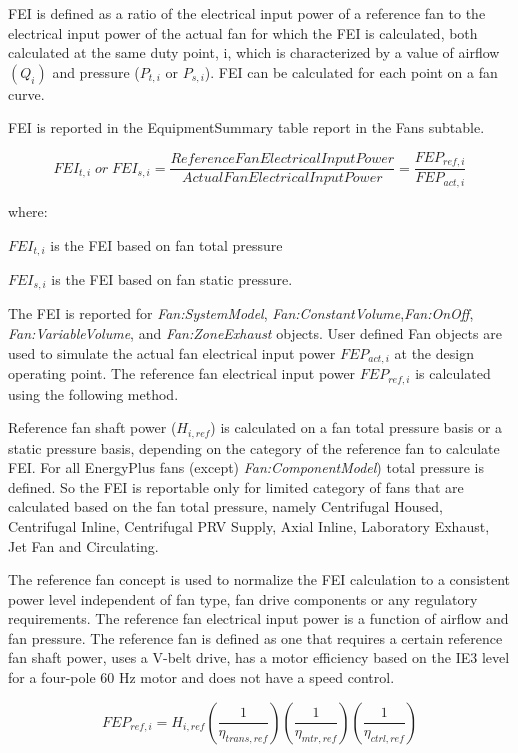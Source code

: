 {{{FEI is defined as a ratio of the electrical input power of a reference fan to the electrical input power of the actual fan for which the FEI is calculated, both calculated at the same duty point, i, which is characterized by a value of airflow \((Q_i)\) and pressure (\(P_{t,i}\) or \(P_{s,i}\)). FEI can be calculated for each point on a fan curve.

FEI is reported in the EquipmentSummary table report in the Fans subtable.

\begin{equation}
FEI_{t,i}\;or\;FEI_{s,i}=\frac{Reference Fan Electrical Input Power}{Actual Fan Electrical Input Power} = \frac{FEP_{ref,i}}{FEP_{act,i}}
\label{eq:fei_calculation}
\end{equation}

where:

\(FEI_{t,i}\) is the FEI based on fan total pressure

\(FEI_{s,i}\) is the FEI based on fan static pressure.

The FEI is reported for \emph{Fan:SystemModel}, \emph{Fan:ConstantVolume},\emph{Fan:OnOff}, \emph{Fan:VariableVolume}, and \emph{Fan:ZoneExhaust} objects. User defined Fan objects are used to simulate the actual fan electrical input power \(FEP_{act,i}\) at the design operating point. The reference fan electrical input power \(FEP_{ref,i}\) is calculated using the following method.

Reference fan shaft power (\(H_{i,ref}\)) is calculated on a fan total pressure basis or a static pressure basis, depending on the category of the reference fan to calculate FEI. For all EnergyPlus fans (except) \emph{Fan:ComponentModel}) total pressure is defined. So the FEI is reportable only for limited category of fans that are calculated based on the fan total pressure, namely Centrifugal Housed, Centrifugal Inline, Centrifugal PRV Supply, Axial Inline, Laboratory Exhaust, Jet Fan and Circulating. 

The reference fan concept is used to normalize the FEI calculation to a consistent power level independent of fan type, fan drive components or any regulatory requirements. The reference fan electrical input power is a function of airflow and fan pressure. The reference fan is defined as one that requires a certain reference fan shaft power, uses a V-belt drive, has a motor efficiency based on the IE3 level for a four-pole 60 Hz motor and does not have a speed control.

\begin{equation}
FEP_{ref,i}=H_{i,ref}(\frac{1}{\eta_{trans,ref}} )(\frac{1}{\eta_{mtr,ref}})(\frac{1}{\eta_{ctrl,ref}}) 
\label{eq:fep_calculation}
\end{equation}

}}}
